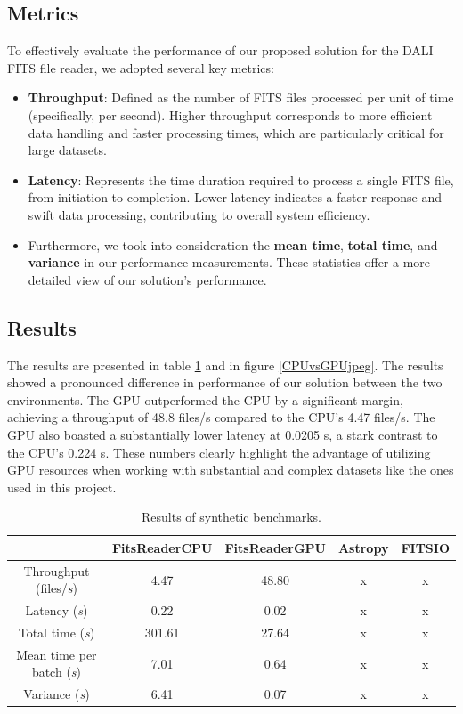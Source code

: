 \documentclass[licencjacka,en]{pracamgr}
\begin{document}
\subsection{Metrics}
To effectively evaluate the performance of our proposed solution for the DALI FITS file reader, we adopted several key metrics:
\begin{itemize}
    \item \textbf{Throughput}: Defined as the number of FITS files processed per unit of time (specifically, per second). Higher throughput corresponds to more efficient data handling and faster processing times, which are particularly critical for large datasets.
    \item \textbf{Latency}: Represents the time duration required to process a single FITS file, from initiation to completion. Lower latency indicates a faster response and swift data processing, contributing to overall system efficiency.
    \item Furthermore, we took into consideration the \textbf{mean time}, \textbf{total time}, and \textbf{variance} in our performance measurements. These statistics offer a more detailed view of our solution's performance.
\end{itemize}


\subsection{Results}
The results are presented in table \ref{CPUvsGPU} and in figure \ref{CPUvsGPUjpeg}.
The results showed a pronounced difference in performance of our solution between the two environments. The GPU outperformed the CPU by a significant margin, achieving a throughput of 48.8 files/s compared to the CPU's 4.47 files/s. The GPU also boasted a substantially lower latency at 0.0205 s, a stark contrast to the CPU's 0.224 s. These numbers clearly highlight the advantage of utilizing GPU resources when working with substantial and complex datasets like the ones used in this project.


\renewcommand{\arraystretch}{2}
\begin{table}[H]
    \centering
    \begin{tabular}{|c|c|c|c|c|}
        \hline
        & FitsReaderCPU & FitsReaderGPU & Astropy & FITSIO \\\hline
        Throughput (files/\textit{s}) & 4.47 & 48.80 & x & x \\\hline
        Latency (\textit{s}) & 0.22 & 0.02 & x & x \\\hline
        Total time (\textit{s}) & 301.61 & 27.64 & x & x \\\hline
        Mean time per batch (\textit{s}) & 7.01 & 0.64 & x & x \\\hline
        Variance (\textit{s}) & 6.41 & 0.07 & x & x \\\hline
    \end{tabular}
    \caption{\label{CPUvsGPU} Results of synthetic benchmarks.}
\end{table}
\end{document}
